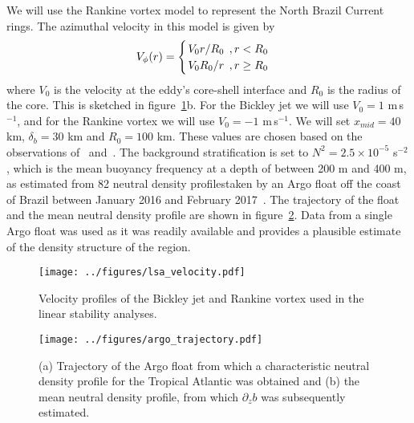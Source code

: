 We will use the Rankine vortex model to represent the North Brazil Current rings. The azimuthal velocity in this model is given by
\begin{equation}
    V_{\phi}(r) = 
    \begin{cases}
        \flatfrac{V_0 r}{R_0} \, , r < R_0 \\
        \flatfrac{V_0 R_0}{r} \, , r \geq R_0
    \end{cases}
\end{equation}
where $V_0$ is the velocity at the eddy's core-shell interface and $R_0$ is the radius of the core. This is sketched in figure~\ref{fig:InitialVelocity}b. For the Bickley jet we will use $V_0 = 1$ m$\,$s$^{-1}$, and for the Rankine vortex we will use $V_0 = - 1$ m$\,$s$^{-1}$. We will set $x_{mid} = 40$ km, $\delta_b = 30$ km and $R_0 = 100$ km. These values are chosen based on the observations of~\citet{Johns1998} and~\citet{Castelao2011}. The background stratification is set to $N^2 = 2.5 \times 10^{-5}$ s$^{-2}$, which is the mean buoyancy frequency at a depth of between 200 m and 400 m, as estimated from 82 neutral density profiles\footnotemark taken by an Argo float off the coast of Brazil between January 2016 and February 2017~\citep{Argo2022}. The trajectory of the float and the mean neutral density profile are shown in figure~\ref{fig:InitialStratification}. Data from a single Argo float was used as it was readily available and provides a plausible estimate of the density structure of the region.

\begin{figure}[t]
    \centering
    \texttt{[image: ../figures/lsa\_velocity.pdf]}
    \caption{Velocity profiles of the Bickley jet and Rankine vortex used in the linear stability analyses.}
    \label{fig:InitialVelocity}
\end{figure}

\begin{figure}[t]
    \centering
    \texttt{[image: ../figures/argo\_trajectory.pdf]}
    \caption{(a) Trajectory of the Argo float from which a characteristic neutral density profile for the Tropical Atlantic was obtained and (b) the mean neutral density profile, from which $\partial_z b$ was subsequently estimated.}
    \label{fig:InitialStratification}
\end{figure}

